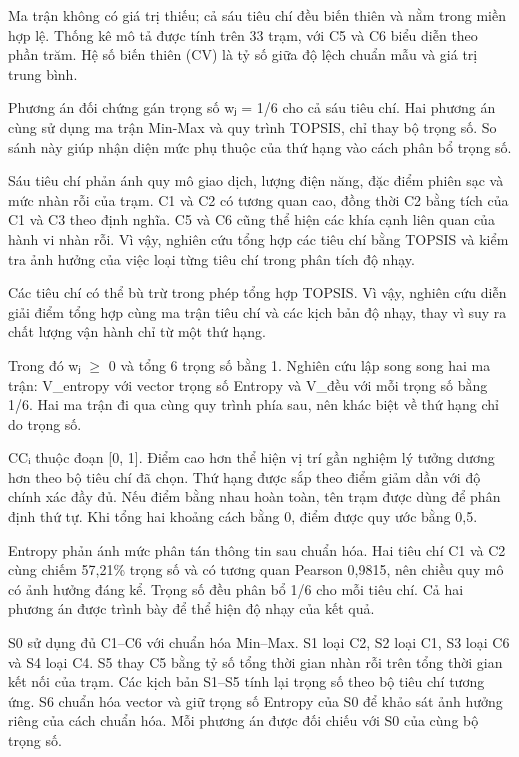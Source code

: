 \documentclass[conference,a4paper]{IEEEtran}
\begin{document}
Ma trận không có giá trị thiếu; cả sáu tiêu chí đều biến thiên và nằm trong miền hợp lệ. Thống kê mô tả được tính trên 33 trạm, với C5 và C6 biểu diễn theo phần trăm. Hệ số biến thiên (CV) là tỷ số giữa độ lệch chuẩn mẫu và giá trị trung bình.

Phương án đối chứng gán trọng số wⱼ = 1/6 cho cả sáu tiêu chí. Hai phương án cùng sử dụng ma trận Min-Max và quy trình TOPSIS, chỉ thay bộ trọng số. So sánh này giúp nhận diện mức phụ thuộc của thứ hạng vào cách phân bổ trọng số.

Sáu tiêu chí phản ánh quy mô giao dịch, lượng điện năng, đặc điểm phiên sạc và mức nhàn rỗi của trạm. C1 và C2 có tương quan cao, đồng thời C2 bằng tích của C1 và C3 theo định nghĩa. C5 và C6 cũng thể hiện các khía cạnh liên quan của hành vi nhàn rỗi. Vì vậy, nghiên cứu tổng hợp các tiêu chí bằng TOPSIS và kiểm tra ảnh hưởng của việc loại từng tiêu chí trong phân tích độ nhạy.

Các tiêu chí có thể bù trừ trong phép tổng hợp TOPSIS. Vì vậy, nghiên cứu diễn giải điểm tổng hợp cùng ma trận tiêu chí và các kịch bản độ nhạy, thay vì suy ra chất lượng vận hành chỉ từ một thứ hạng.

Trong đó wⱼ  \(\geq\)  0 và tổng 6 trọng số bằng 1. Nghiên cứu lập song song hai ma trận: V\_entropy với vector trọng số Entropy và V\_đều với mỗi trọng số bằng 1/6. Hai ma trận đi qua cùng quy trình phía sau, nên khác biệt về thứ hạng chỉ do trọng số.

CCᵢ thuộc đoạn [0, 1]. Điểm cao hơn thể hiện vị trí gần nghiệm lý tưởng dương hơn theo bộ tiêu chí đã chọn. Thứ hạng được sắp theo điểm giảm dần với độ chính xác đầy đủ. Nếu điểm bằng nhau hoàn toàn, tên trạm được dùng để phân định thứ tự. Khi tổng hai khoảng cách bằng 0, điểm được quy ước bằng 0,5.

Entropy phản ánh mức phân tán thông tin sau chuẩn hóa. Hai tiêu chí C1 và C2 cùng chiếm 57,21\% trọng số và có tương quan Pearson 0,9815, nên chiều quy mô có ảnh hưởng đáng kể. Trọng số đều phân bổ 1/6 cho mỗi tiêu chí. Cả hai phương án được trình bày để thể hiện độ nhạy của kết quả.

S0 sử dụng đủ C1–C6 với chuẩn hóa Min–Max. S1 loại C2, S2 loại C1, S3 loại C6 và S4 loại C4. S5 thay C5 bằng tỷ số tổng thời gian nhàn rỗi trên tổng thời gian kết nối của trạm. Các kịch bản S1–S5 tính lại trọng số theo bộ tiêu chí tương ứng. S6 chuẩn hóa vector và giữ trọng số Entropy của S0 để khảo sát ảnh hưởng riêng của cách chuẩn hóa. Mỗi phương án được đối chiếu với S0 của cùng bộ trọng số.
\end{document}
